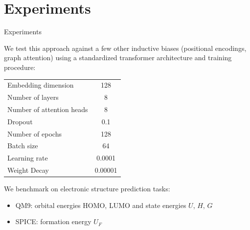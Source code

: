 \documentclass{beamer}
\begin{document}
\section{Experiments}

\begin{frame}{Experiments}

We test this approach against a few other inductive biases (positional encodings, graph attention) using a standardized transformer architecture and training procedure:
\begin{table}
    \scriptsize
    \centering
    \begin{tabular}{lc}
    \toprule
    Embedding dimension & 128 \\
    Number of layers & 8 \\
    Number of attention heads & 8 \\
    Dropout & 0.1 \\
    Number of epochs & 128 \\
    Batch size & 64 \\
    Learning rate & 0.0001 \\
    Weight Decay & 0.00001 \\
    \bottomrule
    \end{tabular}
\end{table}

We benchmark on electronic structure prediction tasks:
\begin{itemize}
    \item QM9: orbital energies HOMO, LUMO and state energies $U$, $H$, $G$
    \item SPICE: formation energy $U_F$
\end{itemize}

\end{frame}
\end{document}
